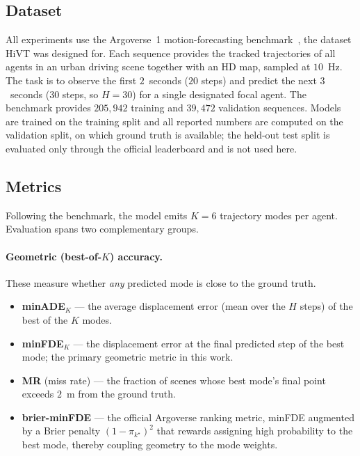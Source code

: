 \subsection{Dataset}
\label{ssec:setup_data}
All experiments use the Argoverse~1 motion-forecasting
benchmark~\cite{chang2019argoverse}, the dataset HiVT was designed for. Each
sequence provides the tracked trajectories of all agents in an urban driving scene
together with an HD map, sampled at $10$~Hz. The task is to observe the first
$2$~seconds ($20$ steps) and predict the next $3$~seconds ($30$ steps, so $H=30$)
for a single designated focal agent. The benchmark provides $205{,}942$ training
and $39{,}472$ validation sequences. Models are trained on the training split and
all reported numbers are computed on the validation split, on which ground truth is
available; the held-out test split is evaluated only through the official
leaderboard and is not used here.

\subsection{Metrics}
\label{ssec:setup_metrics}
Following the benchmark, the model emits $K=6$ trajectory modes per agent.
Evaluation spans two complementary groups.

\paragraph{Geometric (best-of-$K$) accuracy.}
These measure whether \emph{any} predicted mode is close to the ground truth.
\begin{itemize}[leftmargin=1.4em]
  \item \textbf{minADE}$_K$ --- the average displacement error (mean over the $H$
        steps) of the best of the $K$ modes.
  \item \textbf{minFDE}$_K$ --- the displacement error at the final predicted step
        of the best mode; the primary geometric metric in this work.
  \item \textbf{MR} (miss rate) --- the fraction of scenes whose best mode's final
        point exceeds $2$~m from the ground truth.
  \item \textbf{brier-minFDE} --- the official Argoverse ranking metric, minFDE
        augmented by a Brier penalty $(1-\pi_{k^\star})^2$ that rewards assigning
        high probability to the best mode, thereby coupling geometry to the mode
        weights.
\end{itemize}


